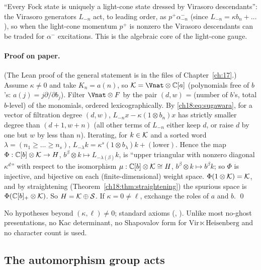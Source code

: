 \begin{physics}
``Every Fock state is uniquely a light-cone state dressed by Virasoro descendants'': the Virasoro
generators $L_{-n}$ act, to leading order, as $p^+\alpha^-_{-n}$ (since $L_{-n}=\kappa b_n+\dots$), so
when the light-cone momentum $p^+$ is nonzero the Virasoro descendants can be traded for $\alpha^-$
excitations.  This is the algebraic core of the light-cone gauge.
\end{physics}

\paragraph{Proof on paper.}  (The Lean proof of the general statement is in the files of Chapter~\ref{ch:17}.)  Assume $\kappa\neq0$ and take $K_n=a(n)$, so $\chXVIIIK=\Vnat\otimes\mathbb C[a]$ (polynomials free of $b$'s:
$a(j)=j\partial/\partial b_j$).  Filter $\Vnat\otimes F$ by the pair $(d,w)$ = (number of $b$'s, total $b$-level) of
the monomials, ordered lexicographically.  By \eqref{ch18:eq:sugawara}, for a vector of filtration degree
$(d,w)$, $L_{-n}x-\kappa(1\otimes b_n)x$ has strictly smaller degree than $(d+1,w+n)$ (all other terms of
$L_{-n}$ either keep $d$, or raise $d$ by one but $w$ by less than $n$).  Iterating, for $k\in\mathcal{K}$ and a sorted word
$\lambda=(n_1\ge\dots\ge n_s)$, $L_{-\lambda}k=\kappa^s(1\otimes b_\lambda)k+(\text{lower})$.  Hence the map
$\Phi:\mathbb C[b]\otimes\mathcal{K}\to H$, $b^\beta\otimes k\mapsto L_{-\lambda(\beta)}k$, is ``upper triangular with nonzero
diagonal $\kappa^d$'' with respect to the isomorphism $\mu:\mathbb C[b]\otimes\mathcal{K}\cong H$, $b^\beta\otimes k\mapsto
b^\beta k$; so $\Phi$ is injective, and bijective on each (finite-dimensional) weight space.
$\Phi(1\otimes\mathcal{K})=\mathcal{K}$, and by straightening (Theorem~\ref{ch18:thm:straightening}) the spurious space is
$\Phi(\mathbb C[b]_+\otimes\mathcal{K})$.  So $H=\mathcal{K}\oplus\mathcal{S}$.  If $\kappa=0\neq\ell$, exchange the roles of $a$ and $b$. \qed

\begin{status}
No hypotheses beyond $(\kappa,\ell)\neq0$; standard axioms (,
).  Unlike most no-ghost presentations, no Kac determinant,
no Shapovalov form for $\mathrm{Vir}\ltimes\text{Heisenberg}$ and no character count is used.
\end{status}

\subsection{The automorphism group acts}

